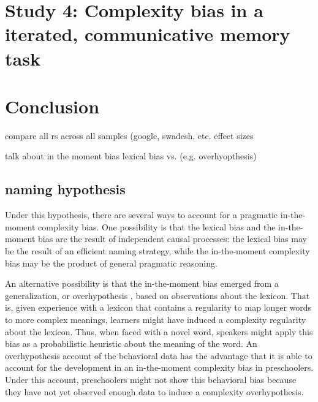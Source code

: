\section{Study 4: Complexity bias in a iterated, communicative memory task}

\section{Conclusion}
compare all rs across all samples (google, swadesh, etc.
effect sizes

talk about in the moment bias  lexical bias vs. (e.g. overhyopthesis)

\subsection{naming hypothesis}
Under this hypothesis, there are several ways to account for a pragmatic in-the-moment complexity bias. One possibility is that the lexical bias and the in-the-moment bias are the result of independent causal processes: the lexical bias may be the result of an efficient naming strategy, while the in-the-moment complexity bias may be the product of  general pragmatic reasoning. 

An alternative possibility is that  the  in-the-moment bias emerged from a generalization, or overhypothesis \cite{kemp2007}, based on observations about the lexicon. That is, given experience with a lexicon that contains a regularity to map longer words to more complex meanings, learners might have induced a complexity  regularity about the lexicon. Thus, when faced with a novel word, speakers might apply this bias as a probabilistic heuristic about the meaning of the word. An overhypothesis account of the behavioral data has the advantage that it is able to account for the development  in an in-the-moment complexity bias in preschoolers. Under this account, preschoolers might not show this behavioral bias because they have not yet observed enough data to induce a complexity overhypothesis.




